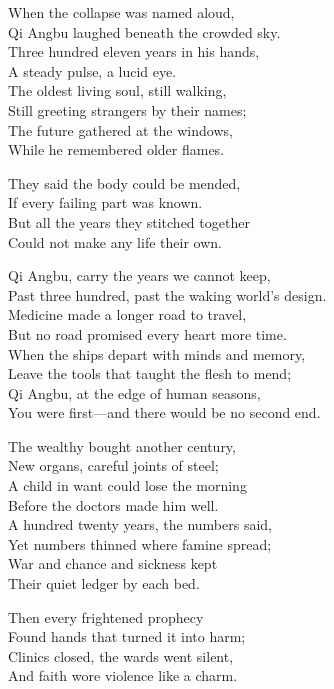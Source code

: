 \begin{lyrics}
When the collapse was named aloud,\\
Qi Angbu laughed beneath the crowded sky.\\
Three hundred eleven years in his hands,\\
A steady pulse, a lucid eye.\\
The oldest living soul, still walking,\\
Still greeting strangers by their names;\\
The future gathered at the windows,\\
While he remembered older flames.

They said the body could be mended,\\
If every failing part was known.\\
But all the years they stitched together\\
Could not make any life their own.

Qi Angbu, carry the years we cannot keep,\\
Past three hundred, past the waking world’s design.\\
Medicine made a longer road to travel,\\
But no road promised every heart more time.\\
When the ships depart with minds and memory,\\
Leave the tools that taught the flesh to mend;\\
Qi Angbu, at the edge of human seasons,\\
You were first—and there would be no second end.

The wealthy bought another century,\\
New organs, careful joints of steel;\\
A child in want could lose the morning\\
Before the doctors made him well.\\
A hundred twenty years, the numbers said,\\
Yet numbers thinned where famine spread;\\
War and chance and sickness kept\\
Their quiet ledger by each bed.

Then every frightened prophecy\\
Found hands that turned it into harm;\\
Clinics closed, the wards went silent,\\
And faith wore violence like a charm.


\end{lyrics}
